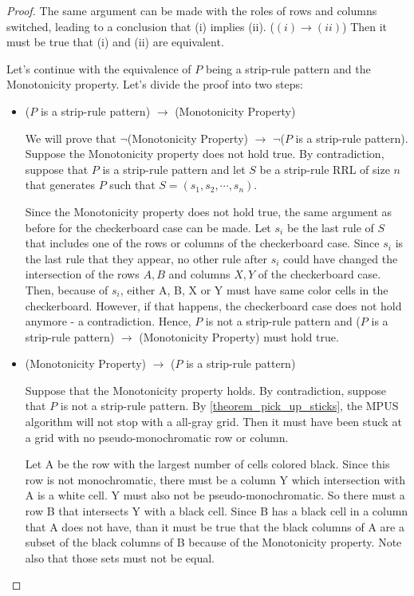\begin{proof}
The same argument can be made with the roles of rows and columns switched, leading to a conclusion that (i) implies (ii). ($(i) \rightarrow (ii)$) Then it must be true that (i) and (ii) are equivalent.


Let's continue with the equivalence of $P$ being a strip-rule pattern and the Monotonicity property. Let's divide the proof into two steps:

\begin{itemize}

\item ($P$ is a strip-rule pattern) $\rightarrow$ (Monotonicity Property)

We will prove that $\neg$(Monotonicity Property) $\rightarrow$ $\neg$($P$ is a strip-rule pattern). Suppose the Monotonicity property does not hold true. By contradiction, suppose that $P$ is a strip-rule pattern and let $S$ be a strip-rule RRL of size $n$ that generates $P$ such that $S = (s_{1},s_{2},\cdots,s_{n})$.

Since the Monotonicity property does not hold true, the same argument as before for the checkerboard case can be made. Let $s_{i}$ be the last rule of $S$ that includes one of the rows or columns of the checkerboard case. Since $s_{i}$ is the last rule that they appear, no other rule after $s_{i}$ could have changed the intersection of the rows ${A,B}$ and columns ${X,Y}$ of the checkerboard case. Then, because of $s_{i}$, either A, B, X or Y must have same color cells in the checkerboard. However, if that happens, the checkerboard case does not hold anymore - a contradiction. Hence, $P$ is not a strip-rule pattern and ($P$ is a strip-rule pattern) $\rightarrow$ (Monotonicity Property) must hold true.

\item (Monotonicity Property) $\rightarrow$ ($P$ is a strip-rule pattern)


Suppose that the Monotonicity property holds. By contradiction, suppose that $P$ is not a strip-rule pattern.
By \ref{theorem_pick_up_sticks}, the MPUS algorithm will not stop with a all-gray grid. Then it must have been stuck at a grid with no pseudo-monochromatic row or column.

Let A be the row with the largest number of cells colored black. Since this row is not monochromatic, there must be a column Y which intersection with A is a white cell. Y must also not be pseudo-monochromatic. So there must a row B that intersects Y with a black cell. Since B has a black cell in a column that A does not have, than it must be true that the black columns of A are a subset of the black columns of B because of the Monotonicity property. Note also that those sets must not be equal.


\end{itemize}
\end{proof}
